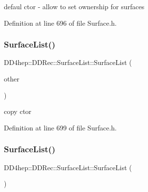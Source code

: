 defaul c\textquotesingle{}tor -\/ allow to set ownership for surfaces 



Definition at line 696 of file Surface.\+h.

\hypertarget{class_d_d4hep_1_1_d_d_rec_1_1_surface_list_a0815581e1cd48827919bd78fdc01107c}{}\label{class_d_d4hep_1_1_d_d_rec_1_1_surface_list_a0815581e1cd48827919bd78fdc01107c} 
\subsubsection{\texorpdfstring{Surface\+List()}{SurfaceList()}\hspace{0.1cm}{\footnotesize\ttfamily [2/4]}}
{\footnotesize\ttfamily D\+D4hep\+::\+D\+D\+Rec\+::\+Surface\+List\+::\+Surface\+List (\begin{DoxyParamCaption}\item[{const \hyperlink{class_d_d4hep_1_1_d_d_rec_1_1_surface_list}{Surface\+List} \&}]{other }\end{DoxyParamCaption})\hspace{0.3cm}{\ttfamily [inline]}}



copy c\textquotesingle{}tor 



Definition at line 699 of file Surface.\+h.

\hypertarget{class_d_d4hep_1_1_d_d_rec_1_1_surface_list_af1e802fd9aee21769c7ff3a3ed7f2e65}{}\label{class_d_d4hep_1_1_d_d_rec_1_1_surface_list_af1e802fd9aee21769c7ff3a3ed7f2e65} 
\subsubsection{\texorpdfstring{Surface\+List()}{SurfaceList()}\hspace{0.1cm}{\footnotesize\ttfamily [3/4]}}
{\footnotesize\ttfamily D\+D4hep\+::\+D\+D\+Rec\+::\+Surface\+List\+::\+Surface\+List (\begin{DoxyParamCaption}\item[{const \hyperlink{class_d_d4hep_1_1_geometry_1_1_det_element}{Geometry\+::\+Det\+Element} \&}]{ }\end{DoxyParamCaption})\hspace{0.3cm}{\ttfamily [inline]}}



